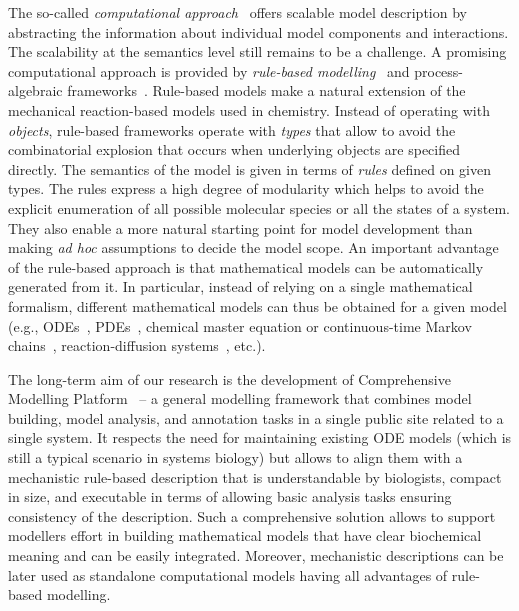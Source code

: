 \documentclass[11pt,a4paper]{report}
\begin{document}
The so-called \emph{computational approach}~\cite{Cardelli,Henzinger} offers scalable model description by abstracting the information about individual model components and interactions. The scalability at the semantics level still remains to be a challenge. A promising computational approach is provided by \emph{rule-based modelling}~\cite{kappa_formal,harris2016bionetgen} and process-algebraic frameworks~\cite{Cardelli,BioPEPA,BioSPI}. Rule-based models make a natural extension of the mechanical reaction-based models used in chemistry. Instead of operating with \emph{objects}, rule-based frameworks operate with \emph{types} that allow to avoid the combinatorial explosion that occurs when underlying objects are specified directly. The semantics of the model is given in terms of \emph{rules} defined on given types. The rules express a high degree of modularity which helps to avoid the explicit enumeration of all possible molecular species or all the states of a system. They also enable a more natural starting point for model development than making \emph{ad hoc} assumptions to decide the model scope. An important advantage of the rule-based approach is that mathematical models can be automatically generated from it. In particular, instead of relying on a single mathematical formalism, different mathematical models can thus be obtained for a given model (e.g., ODEs~\cite{camporesi2017k}, PDEs~\cite{andrews2016smoldyn}, chemical master equation or continuous-time Markov chains~\cite{pauleve2010generic,sneddon2011efficient}, reaction-diffusion systems~\cite{sorokina2013simulator}, etc.). 

The long-term aim of our research is the development of Comprehensive Modelling Platform~\cite{klement2013comprehensive,BCS} -- a general modelling framework that combines model building, model analysis, and annotation tasks in a single public site related to a single system. It respects the need for maintaining existing ODE models (which is still a typical scenario in systems biology) but allows to align them with a mechanistic rule-based description that is understandable by biologists, compact in size, and executable in terms of allowing basic analysis tasks ensuring consistency of the description. Such a comprehensive solution allows to support modellers effort in building mathematical models that have clear biochemical meaning and can be
easily integrated. Moreover, mechanistic descriptions can be later used as standalone computational models having all advantages of rule-based modelling. 
\end{document}
